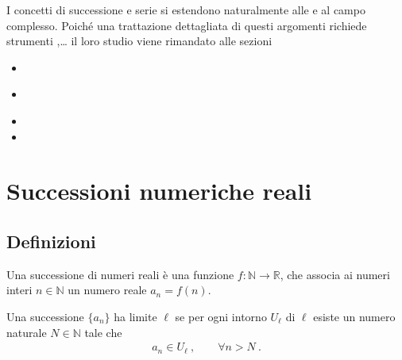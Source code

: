 \documentclass[letterpaper,10pt,italian]{jupyterBook}
\begin{document}
\sphinxAtStartPar
I concetti di successione e serie si estendono naturalmente alle  e al campo complesso. Poiché una trattazione dettagliata di questi argomenti richiede strumenti ,… il loro studio viene rimandato alle sezioni
\begin{itemize}
\item {} 
\sphinxAtStartPar
{\hyperref[\detokenize{ch/series:math-hs-sequence-series-numerical-real}]{}}

\item {} 
\sphinxAtStartPar
{\hyperref[\detokenize{ch/series/series-functions-real:math-hs-series-functions-real}]{}}

\item {} 
\sphinxAtStartPar
{}

\item {} 
\sphinxAtStartPar
{}

\end{itemize}

\sphinxstepscope


\section{Successioni numeriche reali}
\label{\detokenize{ch/series/sequence-numerical-real:successioni-numeriche-reali}}\label{\detokenize{ch/series/sequence-numerical-real:math-hs-sequence-numerical-real}}\label{\detokenize{ch/series/sequence-numerical-real::doc}}

\subsection{Definizioni}
\label{\detokenize{ch/series/sequence-numerical-real:definizioni}}\label{\detokenize{ch/series/sequence-numerical-real:math-hs-sequence-numerical-real-def}}
\sphinxAtStartPar
{} Una successione di numeri reali è una funzione \(f: \mathbb{N} \rightarrow \mathbb{R}\), che associa ai numeri interi \(n \in \mathbb{N}\) un numero reale \(a_n = f(n)\).

\sphinxAtStartPar
{} Una successione \(\{ a_n \}\) ha limite \(\ell\) se per ogni intorno \(U_{\ell}\) di \(\ell\) esiste un numero naturale \(N \in \mathbb{N}\) tale che
\begin{equation*}
\begin{split}a_n \in U_{\ell} \ , \qquad \forall n > N \ .\end{split}
\end{equation*}
\sphinxAtStartPar
{} 
\end{document}
